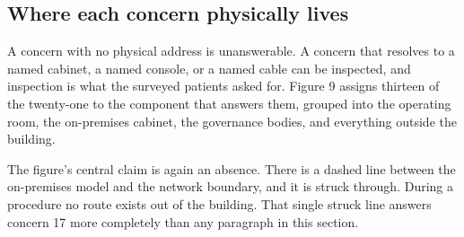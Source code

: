 \subsection{Where each concern physically lives}

A concern with no physical address is unanswerable. A concern that resolves to a
named cabinet, a named console, or a named cable can be inspected, and
inspection is what the surveyed patients asked for. Figure 9 assigns thirteen of
the twenty-one to the component that answers them, grouped into the operating
room, the on-premises cabinet, the governance bodies, and everything outside the
building.

The figure's central claim is again an absence. There is a dashed line between
the on-premises model and the network boundary, and it is struck through. During
a procedure no route exists out of the building. That single struck line answers
concern 17 more completely than any paragraph in this section.

